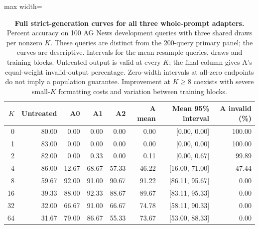 \begin{table}[p]
\centering\color{blue}
\caption{\textbf{Full strict-generation curves for all three whole-prompt adapters.} Percent accuracy on 100 AG News development queries with three shared draws per nonzero $K$. These queries are distinct from the 200-query primary panel; the curves are descriptive. Intervals for the mean resample queries, draws and training blocks. Untreated output is valid at every $K$; the final column gives A's equal-weight invalid-output percentage. Zero-width intervals at all-zero endpoints do not imply a population guarantee. Improvement at $K\geq8$ coexists with severe small-$K$ formatting costs and variation between training blocks.}
\label{stab:final_curves}
\footnotesize
\begin{adjustbox}{max width=\textwidth}
\begin{tabular}{rrrrrrrr}
\toprule
$K$ & Untreated & A0 & A1 & A2 & A mean & Mean 95\% interval & A invalid (\%) \\
\midrule
0 & 80.00 & 0.00 & 0.00 & 0.00 & 0.00 & [0.00, 0.00] & 100.00 \\
1 & 83.00 & 0.00 & 0.00 & 0.00 & 0.00 & [0.00, 0.00] & 100.00 \\
2 & 82.00 & 0.00 & 0.33 & 0.00 & 0.11 & [0.00, 0.67] & 99.89 \\
4 & 86.00 & 12.67 & 68.67 & 57.33 & 46.22 & [16.00, 71.00] & 47.44 \\
8 & 59.67 & 92.00 & 91.00 & 90.67 & 91.22 & [86.11, 95.67] & 0.00 \\
16 & 39.33 & 88.00 & 92.33 & 88.67 & 89.67 & [83.11, 95.33] & 0.00 \\
32 & 32.00 & 66.67 & 91.00 & 66.67 & 74.78 & [58.11, 90.33] & 0.00 \\
64 & 31.67 & 79.00 & 86.67 & 55.33 & 73.67 & [53.00, 88.33] & 0.00 \\
\bottomrule
\end{tabular}
\end{adjustbox}
\end{table}


